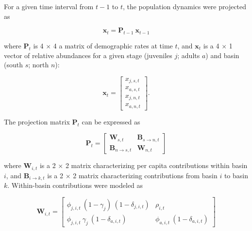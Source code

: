 \documentclass[11pt]{article}
\begin{document}
For a given time interval from $t-1$ to $t$, 
the population dynamics were projected as
%
\begin{linenomath*}
\begin{equation} \label{eq:XPX}
    \mathbf{x}_t = \mathbf{P}_{t-1}~\mathbf{x}_{t-1}
\end{equation}
\end{linenomath*}
%
where $\mathbf{P}_{t}$ is 4 $\times$ 4 a matrix of demographic rates at time $t$, 
and $\mathbf{x}_{t}$ is a 4 $\times$ 1 vector of relative abundances 
for a given stage (juveniles $j$; adults $a$) 
and basin (south $s$; north $n$):
%
\begin{linenomath*}
\begin{equation} \label{eq:X}
\mathbf{x}_{t} = 
\left[
\begin{array}{cccc}
    {x_{j,s,t}} \\
    {x_{a,s,t}} \\
    {x_{j,n,t}} \\
    {x_{a,n,t}}
    \end{array}
\right]
\textrm{.}
\end{equation}
\end{linenomath*}
%
The projection matrix $\mathbf{P}_{t}$ can be expressed as
%
\begin{linenomath*}
\begin{equation} \label{eq:P}
\mathbf{P}_{t} = 
\left[
\begin{array}{c|ccc}
    \mathbf{W}_{s,t}  & \mathbf{B}_{s\rightarrow n,t} \\
    \hline
    \mathbf{B}_{n\rightarrow s,t} & \mathbf{W}_{n,t}
    \end{array}
\right]
\end{equation}
\end{linenomath*}
%
where $\mathbf{W}_{i,t}$ is a 2 $\times$ 2 matrix characterizing 
per capita contributions within basin $i$,
and $\mathbf{B}_{i\rightarrow k,t}$ is a 2 $\times$ 2 matrix characterizing 
contributions from basin $i$ to basin $k$.
Within-basin contributions were modeled as 
%
\begin{linenomath*}
\begin{equation} \label{eq:W}
\mathbf{W}_{i,t} = 
\left[
\begin{array}{cccc}
    \phi_{j,i,t}~(1-\gamma_{j})~(1-\delta_{j,i,t}) & 
    \rho_{i,t} \\
    \phi_{j,i,t}~\gamma_{j}~(1-\delta_{a,i,t}) & 
    \phi_{a,i,t}~(1-\delta_{a,i,t})
    \end{array}
\right]
\end{equation}
\end{linenomath*}
\end{document}
